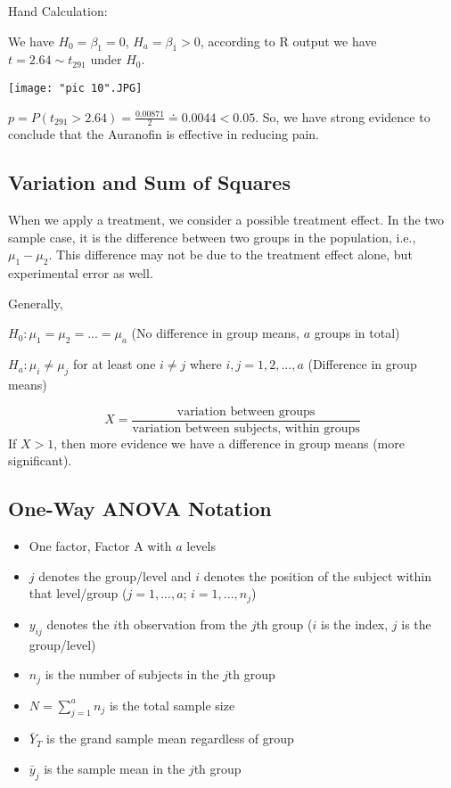 \documentclass[a4paper,11pt]{article}
\begin{document}
Hand Calculation: 

We have $H_0=\beta_1=0$, $H_a=\beta_1>0$, according to R output we have $t=2.64\sim t_{291}$ under $H_0$. 

\begin{center}
	\texttt{[image: "pic 10".JPG]}
\end{center}

$p=P(t_{291}>2.64)=\frac{0.00871}{2}\doteq 0.0044<0.05$. So, we have strong evidence to conclude that the Auranofin is effective in reducing pain. 

\subsection{Variation and Sum of Squares}
When we apply a treatment, we consider a possible treatment effect. In the two sample case, it is the difference between two groups in the population, i.e., $\mu_1-\mu_2$. This difference may not be due to the treatment effect alone, but experimental error as well. 

Generally, 

$H_0: \mu_1=\mu_2=...=\mu_a$ (No difference in group means, $a$ groups in total)

$H_a: \mu_i\neq \mu_j$ for at least one $i\neq j$ where $i,j=1,2,...,a$ (Difference in group means)

$$X=\frac{\text{variation between groups}}{\text{variation between subjects, within groups}}$$
If $X>1$, then more evidence we have a difference in group means (more significant). 

\subsection{One-Way ANOVA Notation}
\begin{itemize}
\item One factor, Factor A with $a$ levels
\item $j$ denotes the group/level and $i$ denotes the position of the subject within that level/group ($j=1,...,a$; $i=1,...,n_j$)
\item $y_{ij}$ denotes the $i$th observation from the $j$th group ($i$ is the index, $j$ is the group/level)
\item $n_j$ is the number of subjects in the $j$th group
\item {$N=\sum_{j=1}^an_j$ is the total sample size}
\item $\bar{Y}_T$ is the grand sample mean regardless of group
\item $\bar{y}_j$ is the sample mean in the $j$th group
\end{itemize}
\end{document}

